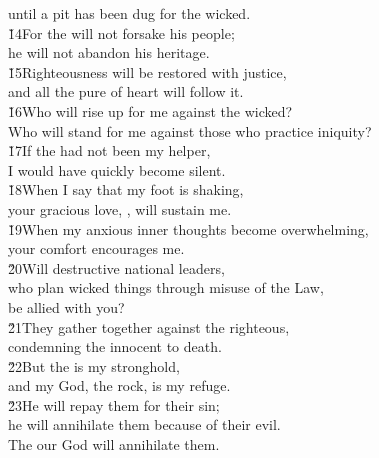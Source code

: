 \begin{poetry}
\poemll    until a pit has been dug for the wicked. \\
\poeml \v{14}For the  will not forsake his people; \\
\poemll    he will not abandon his heritage. \\
\poeml \v{15}Righteousness will be restored with justice, \\
\poemll    and all the pure of heart will follow it. \\
\poeml \v{16}Who will rise up for me against the wicked? \\
\poemll    Who will stand for me against those who practice iniquity? \\
\poeml \v{17}If the  had not been my helper, \\
\poemll    I would have quickly become silent. \\
\poeml \v{18}When I say that my foot is shaking, \\
\poemll    your gracious love, , will sustain me. \\
\poeml \v{19}When my anxious inner thoughts become overwhelming, \\
\poemll    your comfort encourages me. \\
\poeml \v{20}Will destructive national leaders, \\
\poemll    who plan wicked things through misuse of the Law, \\
\poemlll       be allied with you? \\
\poeml \v{21}They gather together against the righteous, \\
\poemll    condemning the innocent to death. \\
\poeml \v{22}But the  is my stronghold, \\
\poemll    and my God, the rock, is my refuge. \\
\poeml \v{23}He will repay them for their sin; \\
\poemll    he will annihilate them because of their evil. \\
\poemlll       The  our God will annihilate them.
\end{poetry}

